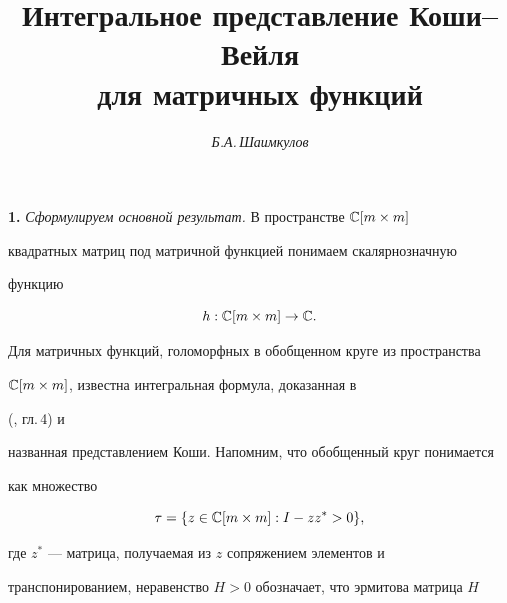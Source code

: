 

 


\author{\it Б.А.\,Шаимкулов} 




\title{Интегральное представление Коши--Вейля\\ 


для матричных функций} 


 


\date{} 




\pagestyle{plain} %


 




\maketitle 


\label{begin} 


 


{\bf 1.} {\it Сформулируем основной результат.} В пространстве $\Bbb 


C[m\times m]$ 


квадратных матриц под матричной функцией понимаем скалярнозначную 


функцию 


$$ 


h:\Bbb C[m\times m]\to\Bbb C. 


$$ 


Для матричных функций, голоморфных в обобщенном круге из пространства 


$\Bbb C[m\times m]$, известна интегральная формула, доказанная в 


(\cite{1}, гл.\,4) и 


названная представлением Коши. Напомним, что обобщенный круг понимается 


как множество 


$$ 


\tau=\{z\in\Bbb C[m\times m]:I-z z^*>0\}, 


$$ 


где $z^*$ --- матрица, получаемая из $z$ сопряжением элементов и 


транспонированием, неравенство $H>0$ обозначает, что эрмитова матрица $H$ 


